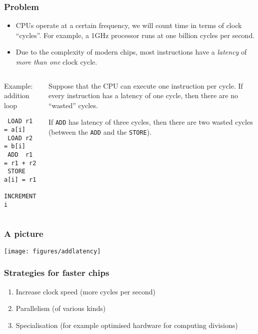 \documentclass[presentation,aspectratio=43,10pt]{beamer}
\begin{document}
\begin{frame}[fragile]
  \frametitle{Problem}
  \begin{itemize}
  \item CPUs operate at a certain frequency, we will count time in
    terms of clock ``cycles''. For example, a 1GHz processor runs at one
    billion cycles per second.
  \item Due to the complexity of modern chips, most instructions have
    a \emph{latency} of \emph{more than one} clock cycle.
  \end{itemize}
  \begin{columns}
    \begin{column}{0.35\textwidth}
      \begin{exampleblock}{Example: addition loop}
\begin{verbatim}
 LOAD r1 = a[i]
 LOAD r2 = b[i]
 ADD  r1 = r1 + r2
 STORE a[i] = r1
 INCREMENT i
\end{verbatim}
      \end{exampleblock}
    \end{column}
    \begin{column}{0.55\textwidth}
      Suppose that the CPU can execute one instruction per cycle. If
      every instruction has a latency of one cycle, then there are no
      ``wasted'' cycles.
      
      If \texttt{ADD} has latency of three cycles, then there are
      two wasted cycles (between the \texttt{ADD} and the
      \texttt{STORE}).
    \end{column}
  \end{columns}
\end{frame}
\begin{frame}
  \frametitle{A picture}
  \begin{center}
    \texttt{[image: figures/addlatency]}
  \end{center}
\end{frame}

\begin{frame}
  \frametitle{Strategies for faster chips}
  \begin{enumerate}
  \item Increase clock speed (more cycles per second)
  \item Parallelism (of various kinds)
  \item Specialisation (for example optimised hardware for computing divisions)
  \end{enumerate}
\end{frame}
\end{document}
